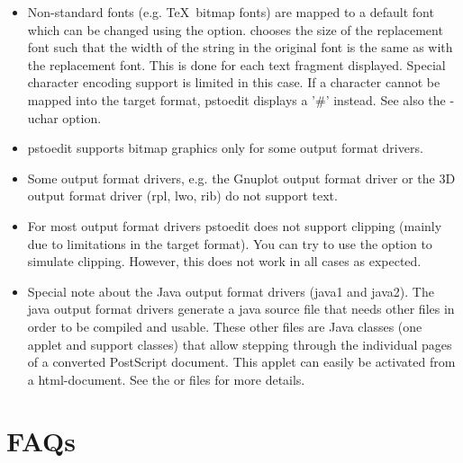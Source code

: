 \documentclass[english,a4paper]{article}
\begin{document}
\begin{itemize}
\item Non-standard fonts (e.g. \TeX\ bitmap fonts) are mapped to a default font which
can be changed using the  option.  chooses the size of
the replacement font such that the width of the string in the original font is
the same as with the replacement font. This is done for each text fragment
displayed. Special character encoding support is limited in this case. If a
character cannot be mapped into the target format, pstoedit displays a '\#'
instead. See also the -uchar option.

\item pstoedit supports bitmap graphics only for some output format drivers.

\item Some output format drivers, e.g. the Gnuplot output format driver or the 3D output format driver (rpl, lwo, rib) do not support text.

\item For most output format drivers pstoedit does not support clipping (mainly due to limitations in the target format). You can try to use the
 option to simulate clipping. However, this does not work in all cases
as expected.

\item Special note about the Java output format drivers (java1 and java2).
The java output format drivers generate a java source file that needs other files in
order to be compiled and usable. These other files are Java classes (one
applet and support classes) that allow stepping through the individual pages
of a converted PostScript document. This applet can easily be activated from
a html-document. See the  or
 files for more details.

\end{itemize}

\section{FAQs}
\end{document}
